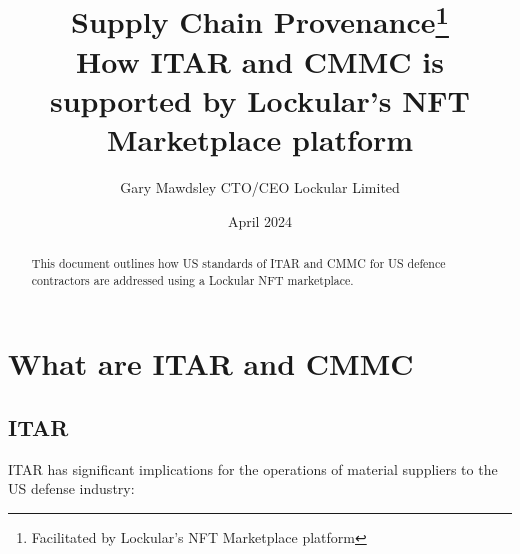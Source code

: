 \documentclass{tufte-handout}
\title{Supply Chain Provenance\thanks{Facilitated by Lockular's NFT Marketplace platform} \\
\large How ITAR and CMMC is supported by Lockular's NFT Marketplace platform}
\author[Gary Mawdsley]{Gary Mawdsley CTO/CEO Lockular Limited}
\date{April 2024}  %
\begin{document}
\maketitle%

\begin{abstract}
\noindent This document outlines how US standards of ITAR and CMMC for US defence contractors are addressed using a Lockular NFT marketplace.

\end{abstract}

{}

\section{What are ITAR and CMMC}\label{sec:page-layout}
\subsection{ITAR}\label{sec:headings}
ITAR has significant implications for the operations of material suppliers to the US defense industry:
\end{document}
